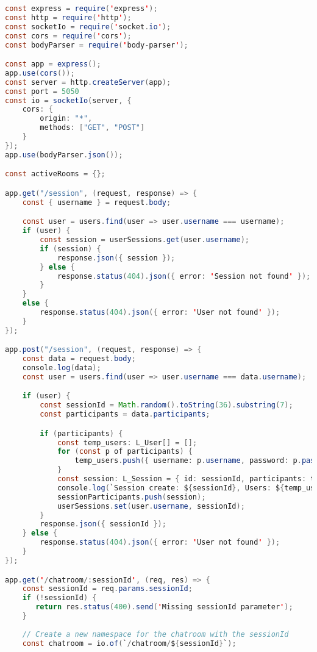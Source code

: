 \begin{lstlisting}[language=Java, caption={Express Backend server}, label={lst:java}]
const express = require('express');
const http = require('http');
const socketIo = require('socket.io');
const cors = require('cors');
const bodyParser = require('body-parser');

const app = express();
app.use(cors());
const server = http.createServer(app);
const port = 5050
const io = socketIo(server, {
    cors: {
        origin: "*",
        methods: ["GET", "POST"]
    }
});
app.use(bodyParser.json());

const activeRooms = {};

app.get("/session", (request, response) => {
    const { username } = request.body;

    const user = users.find(user => user.username === username);
    if (user) {
        const session = userSessions.get(user.username);
        if (session) {
            response.json({ session });
        } else {
            response.status(404).json({ error: 'Session not found' });
        }
    }
    else {
        response.status(404).json({ error: 'User not found' });
    }
});

app.post("/session", (request, response) => {
    const data = request.body;
    console.log(data);
    const user = users.find(user => user.username === data.username);

    if (user) {
        const sessionId = Math.random().toString(36).substring(7);
        const participants = data.participants;

        if (participants) {
            const temp_users: L_User[] = [];
            for (const p of participants) {
                temp_users.push({ username: p.username, password: p.password })
            }
            const session: L_Session = { id: sessionId, participants: temp_users };
            console.log(`Session create: ${sessionId}, Users: ${temp_users.toString()}`)
            sessionParticipants.push(session);
            userSessions.set(user.username, sessionId);
        }
        response.json({ sessionId });
    } else {
        response.status(404).json({ error: 'User not found' });
    }
});

app.get('/chatroom/:sessionId', (req, res) => {
    const sessionId = req.params.sessionId;
    if (!sessionId) {
       return res.status(400).send('Missing sessionId parameter');
    }
  
    // Create a new namespace for the chatroom with the sessionId
    const chatroom = io.of(`/chatroom/${sessionId}`);
  

\end{lstlisting}
